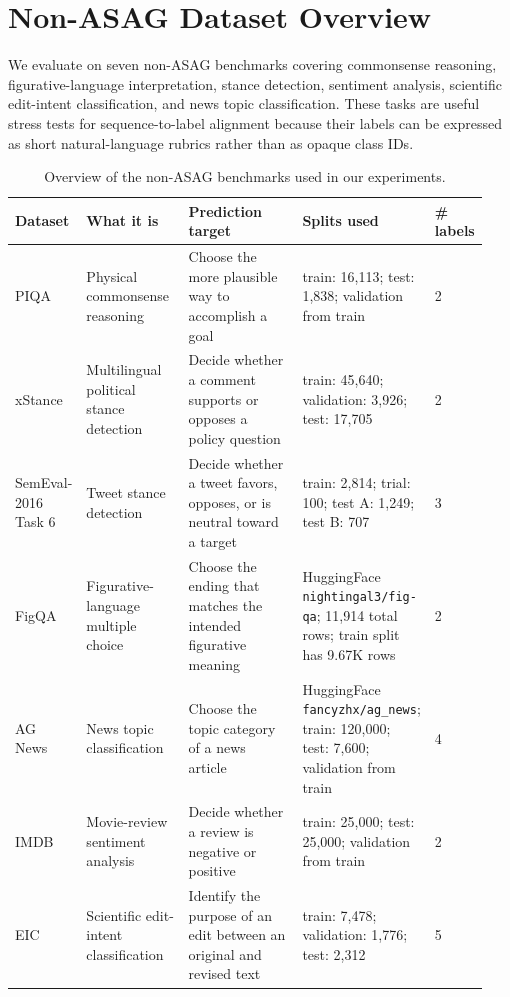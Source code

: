 
\section{Non-ASAG Dataset Overview}
\label{app:non_asag_datasets}

We evaluate on seven non-ASAG benchmarks covering commonsense reasoning,
figurative-language interpretation, stance detection, sentiment analysis,
scientific edit-intent classification, and news topic classification. These
tasks are useful stress tests for sequence-to-label alignment because their
labels can be expressed as short natural-language rubrics rather than as opaque
class IDs.

\begin{table}[t]
\centering
\small
\begin{tabular}{p{0.13\linewidth}p{0.22\linewidth}p{0.26\linewidth}p{0.27\linewidth}p{0.06\linewidth}}
\toprule
\textbf{Dataset} & \textbf{What it is} & \textbf{Prediction target} & \textbf{Splits used} & \textbf{\# labels} \\
\midrule
PIQA & Physical commonsense reasoning & Choose the more plausible way to accomplish a goal & train: 16,113; test: 1,838; validation from train & 2 \\
xStance & Multilingual political stance detection & Decide whether a comment supports or opposes a policy question & train: 45,640; validation: 3,926; test: 17,705 & 2 \\
SemEval-2016 Task 6 & Tweet stance detection & Decide whether a tweet favors, opposes, or is neutral toward a target & train: 2,814; trial: 100; test A: 1,249; test B: 707 & 3 \\
FigQA & Figurative-language multiple choice & Choose the ending that matches the intended figurative meaning & HuggingFace \texttt{nightingal3/fig-qa}; 11,914 total rows; train split has 9.67K rows & 2 \\
AG News & News topic classification & Choose the topic category of a news article & HuggingFace \texttt{fancyzhx/ag\_news}; train: 120,000; test: 7,600; validation from train & 4 \\
IMDB & Movie-review sentiment analysis & Decide whether a review is negative or positive & train: 25,000; test: 25,000; validation from train & 2 \\
EIC & Scientific edit-intent classification & Identify the purpose of an edit between an original and revised text & train: 7,478; validation: 1,776; test: 2,312 & 5 \\
\bottomrule
\end{tabular}
\caption{Overview of the non-ASAG benchmarks used in our experiments.}
\label{tab:non_asag_dataset_overview}
\end{table}

